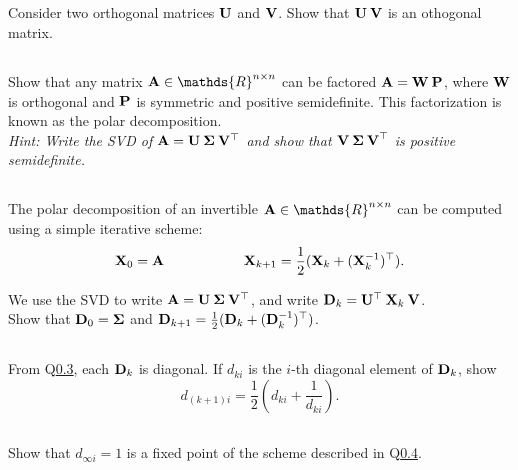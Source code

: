 \subsection{} Consider two orthogonal matrices ${\bf U}$ and ${\bf V}$. Show that ${\bf U\:V}$ is an othogonal matrix.
\vspace{8cm}


\subsection{} Show that any matrix  ${\bf A} \in \mathds{R}^{n \times n}$ can be factored ${\bf A} = {\bf W\:P}$, where  ${\bf W}$ is orthogonal and  ${\bf P}$ is symmetric and positive semidefinite. This factorization is known as the polar decomposition.\\
\textit{Hint: Write the SVD of ${\bf A} = {\bf U \: \Sigma \: V^\top}$ and show that ${\bf V \: \Sigma \: V}^\top$ is positive semidefinite.}
\pagebreak

\subsection{}\label{scheme} The polar decomposition of an invertible ${\bf A} \in \mathds{R}^{n \times n}$ can be computed using a simple iterative scheme:
$$ {\bf X}_0 = {\bf A} \text{\hspace{2cm}} {\bf X}_{k+1} = \frac{1}{2}({\bf X}_k + ({\bf X}_k^{-1})^\top).$$

We use the SVD to write ${\bf A} = {\bf U \: \Sigma \: V^\top}$, and write  ${\bf D}_k = {\bf U}^\top \: {\bf X}_k \: {\bf V}$.\\ Show that ${\bf D}_0 = {\bf \Sigma}$ and ${\bf D}_{k+1} = \frac{1}{2}({\bf D}_k + ({\bf D}_k^{-1})^\top)$.
\vspace{12cm}

\subsection{}\label{scheme_diag} From Q\ref{scheme}, each ${\bf D}_k$ is diagonal. If $d_{ki}$ is the $i$-th diagonal element of ${\bf D}_k$, show
$$ d_{(k+1)i} = \frac{1}{2} \left(d_{ki} + \frac{1}{d_{ki}}\right). $$
\pagebreak


\subsection{}\label{conv} Show that $d_{\infty i} = 1$ is a fixed point of the scheme described in Q\ref{scheme_diag}.
\vspace{12cm}

